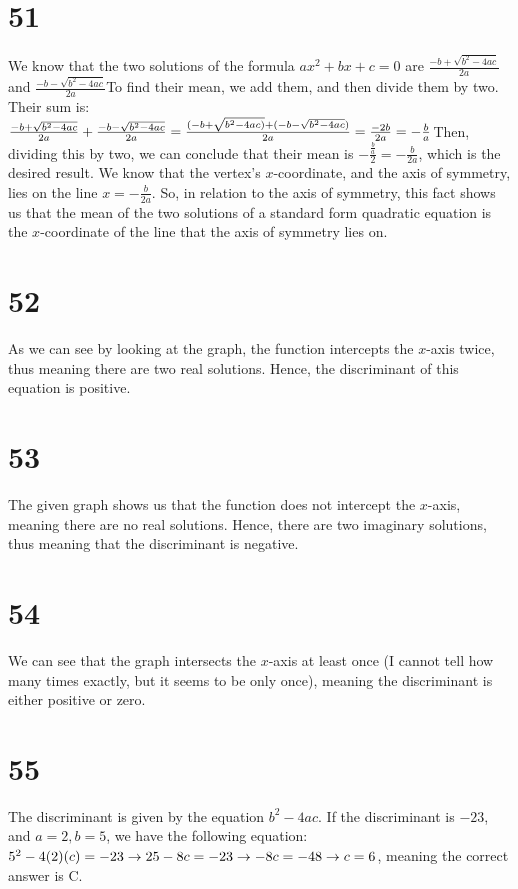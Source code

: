 \documentclass{article}
\theoremstyle{definition}
\begin{document}
\section*{51}
We know that the two solutions of the formula $ax^2+bx+c=0$ are $\frac{-b+\sqrt{b^2-4ac}}{2a}$ and $\frac{-b-\sqrt{b^2-4ac}}{2a}$\newline To find their
mean, we add them, and then divide them by two. Their sum is:\newline $\frac{-b+\sqrt{b^2-4ac}}{2a}+\frac{-b-\sqrt{b^2-4ac}}{2a}\newline =
\frac{(-b+\sqrt{b^2-4ac)}+(-b-\sqrt{b^2-4ac})}{2a}=\frac{-2b}{2a}=-\frac{b}{a}$\newline Then, dividing this by two, we can conclude that their mean is
$-\frac{\frac{b}{a}}{2}=-\frac{b}{2a}$, which is the desired result. We know that the vertex's $x$-coordinate, and the axis of symmetry, lies on
the line $x=-\frac{b}{2a}$. So, in relation to the axis of symmetry, this fact shows us that the mean of the two solutions of a standard form
quadratic equation is the $x$-coordinate of the line that the axis of symmetry lies on.

\section*{52}
As we can see by looking at the graph, the function intercepts the $x$-axis twice, thus meaning there are two real solutions. Hence, the discriminant of 
this equation is positive.

\section*{53}
The given graph shows us that the function does not intercept the $x$-axis, meaning there are no real solutions. Hence, there are two imaginary solutions, 
thus meaning that the discriminant is negative.

\section*{54}
We can see that the graph intersects the $x$-axis at least once (I cannot tell how many times exactly, but it seems to be only once), meaning the 
discriminant is either positive or zero.

\section*{55}
The discriminant is given by the equation $b^2-4ac$. If the discriminant is $-23$, and $a=2,b=5$, we have the following equation:\newline 
$5^2-4(2)(c)=-23\newline\rightarrow 
25-8c=-23\newline\rightarrow 
-8c=-48\newline\rightarrow 
c=6$, meaning the correct answer is C.
\end{document}
